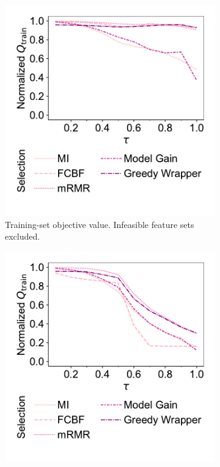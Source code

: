 \documentclass{article}
\theoremstyle{definition}
\begin{document}
\begin{figure}[htbp]
	\centering
	\begin{subfigure}[t]{0.48\textwidth}
		\centering
		\includegraphics[width=\textwidth, trim=20 40 15 15, clip]{plots/afs-impact-tau-fs-method-train-objective-max.pdf}
		\caption{
			Training-set objective value.
			Infeasible feature sets excluded.
		}
		\label{fig:afs:impact-tau-fs-method-train-objective-max}
	\end{subfigure}
	\hfill
	\begin{subfigure}[t]{0.48\textwidth}
		\centering
		\includegraphics[width=\textwidth, trim=20 40 15 15, clip]{plots/afs-impact-tau-fs-method-train-objective-max-fillna.pdf}

\end{subfigure}
\end{figure}
\end{document}
